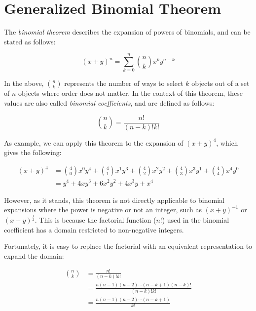 \documentclass{article}
\title{}
\date{}
\author{Kaan Aksoy | Mar 29, 2020}
\begin{document}
\maketitle

\section{Generalized Binomial Theorem}
The \textit{binomial theorem} describes the expansion of powers of 
binomials, and can be stated as follows:

$$(x+y)^n = \sum_{k=0}^n \binom{n}{k}x^k y^{n-k}$$

In the above, $\binom{n}{k}$ represents the number of ways to select 
$k$ objects out of a set of $n$ objects where order does not matter. In 
the context of this theorem, these values are also called 
\textit{binomial coefficients}, and are defined as follows:

$$\binom{n}{k} = \frac{n!}{(n-k)!k!}$$


As example, we can apply this theorem to the expansion of $(x+y)^4$, 
which gives the following:

\begin{equation*}
\begin{split}
(x+y)^4 &= \binom{4}{0}x^0y^4 + \binom{4}{1}x^1y^3 + 
\binom{4}{2}x^2y^2 + \binom{4}{3}x^3y^1 + \binom{4}{4}x^4y^0 \\
&= y^4 + 4xy^3 + 6x^2y^2 + 4x^3y + x^4
\end{split}
\end{equation*}

However, as it stands, this theorem is not directly applicable to 
binomial expansions where the power is negative or not an integer, 
such as $(x+y)^{-1}$ or $(x+y)^{\frac{1}{2}}$. This is because 
the factorial function ($n!$) used in the binomial 
coefficient has a domain restricted to non-negative integers.

Fortunately, it is easy to replace the factorial with an equivalent 
representation to expand the domain:

\begin{equation*}
\begin{split}
\binom{n}{k} &= \frac{n!}{(n-k)!k!} \\
&= \frac{n(n-1)(n-2)\cdots(n-k+1)(n-k)!}{(n-k)!k!} \\ 
&= \frac{n(n-1)(n-2)\cdots(n-k+1)}{k!}
\end{split}
\end{equation*}
\end{document}
